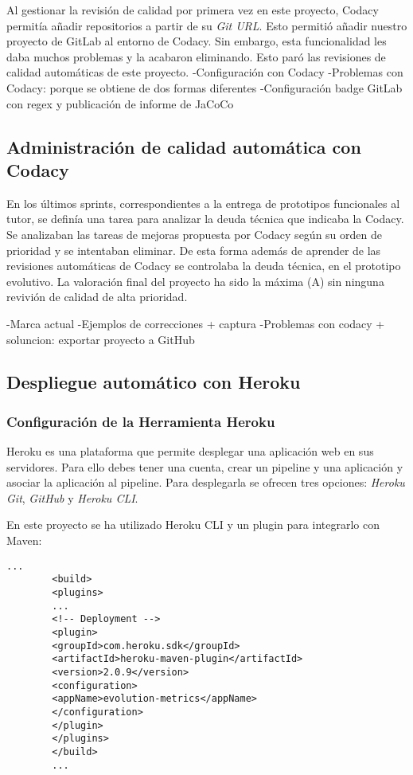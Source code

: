 Al gestionar la revisión de calidad por primera vez en este proyecto, Codacy permitía añadir repositorios a partir de su \textit{Git URL}. Esto permitió añadir nuestro proyecto de GitLab al entorno de Codacy. Sin embargo, esta funcionalidad les daba muchos problemas y la acabaron eliminando. Esto paró las revisiones de calidad automáticas de este proyecto.
-Configuración con Codacy
-Problemas con Codacy: porque se obtiene de dos formas diferentes
-Configuración badge GitLab con regex y publicación de informe de JaCoCo

\subsection{Administración de calidad automática con Codacy}
En los últimos sprints, correspondientes a la entrega de prototipos funcionales al tutor,
se definía una tarea para analizar la deuda técnica que indicaba la Codacy.
Se analizaban las tareas de mejoras propuesta por Codacy según su orden de prioridad y se intentaban eliminar.
De esta forma además de aprender de las revisiones automáticas de Codacy se controlaba la deuda técnica, en el prototipo evolutivo.
La valoración final del proyecto ha sido la máxima (A) sin ninguna revivión de calidad de alta prioridad.

-Marca actual
-Ejemplos de correcciones + captura
-Problemas con codacy + soluncion: exportar proyecto a GitHub

\subsection{Despliegue automático con Heroku}

\subsubsection{Configuración de la Herramienta Heroku}

Heroku es una plataforma que permite desplegar una aplicación web en sus servidores. Para ello debes tener una cuenta, crear un pipeline y una aplicación y asociar la aplicación al pipeline. Para desplegarla se ofrecen tres opciones: \textit{Heroku Git}, \textit{GitHub} y \textit{Heroku CLI}.

En este proyecto se ha utilizado Heroku CLI y un plugin para integrarlo con Maven:\\
\begin{minipage}{\linewidth}
	{\tiny
		\begin{lstlisting}[breaklines]
		...
		<build>
		<plugins>
		...
		<!-- Deployment -->
		<plugin>
		<groupId>com.heroku.sdk</groupId>
		<artifactId>heroku-maven-plugin</artifactId>
		<version>2.0.9</version>
		<configuration>
		<appName>evolution-metrics</appName>
		</configuration>
		</plugin>
		</plugins>
		</build>
		...
		\end{lstlisting}
	}
\end{minipage}


